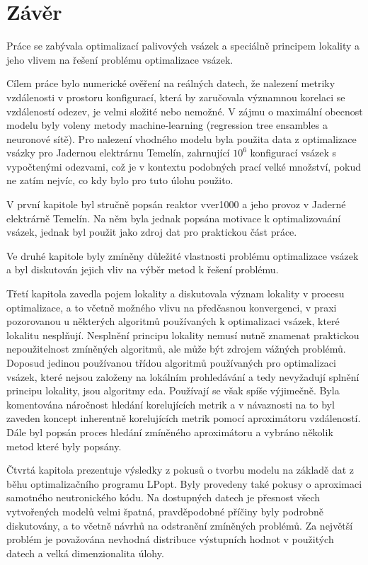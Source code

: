 \chapter*{Závěr} %
Práce se zabývala optimalizací palivových vsázek a speciálně 
principem lokality a jeho vlivem na řešení problému optimalizace vsázek. 

Cílem práce bylo numerické ověření na reálných datech, že nalezení 
metriky vzdálenosti v prostoru konfigurací, která by zaručovala 
významnou korelaci se vzdáleností odezev, je velmi složité nebo nemožné. 
V zájmu o maximální obecnost modelu byly voleny metody machine-learning 
(regression tree ensambles a neuronové sítě). Pro nalezení vhodného 
modelu byla použita data z optimalizace vsázky pro Jadernou elektrárnu 
Temelín, zahrnující $10^6$ konfigurací vsázek s vypočtenými odezvami, 
což je v kontextu podobných prací velké množství, pokud ne zatím nejvíc, 
co kdy bylo pro tuto úlohu použito. 

V první kapitole byl stručně popsán reaktor \ac{vver1000} a jeho provoz 
v Jaderné elektrárně Temelín. Na něm byla jednak popsána motivace 
k optimalizovaání vsázek, jednak byl použit jako zdroj dat pro 
praktickou část práce. 

Ve druhé kapitole byly zmíněny důležité vlastnosti problému optimalizace 
vsázek a byl diskutován jejich vliv na výběr metod k řešení problému. 

Třetí kapitola zavedla pojem lokality a diskutovala význam lokality 
v procesu optimalizace, a to včetně možného vlivu na předčasnou konvergenci, 
v praxi pozorovanou u některých algoritmů používaných k optimalizaci vsázek, 
které lokalitu nesplňují. Nesplnění principu lokality nemusí nutně znamenat 
praktickou nepoužitelnost zmíněných algoritmů, ale může být zdrojem vážných problémů. 
Doposud jedinou používanou třídou algoritmů používaných pro optimalizaci vsázek, 
které nejsou založeny na lokálním prohledávání a tedy nevyžadují splnění 
principu lokality, jsou algoritmy \ac{eda}. Používají se však spíše výjimečně. 
Byla komentována náročnost hledání korelujících 
metrik a v návaznosti na to byl zaveden koncept inherentně korelujících 
metrik pomocí aproximátoru vzdáleností. Dále byl popsán proces hledání 
zmíněného aproximátoru a vybráno několik metod které byly popsány. 

Čtvrtá kapitola prezentuje výsledky z pokusů o tvorbu modelu na 
základě dat z běhu optimalizačního programu LPopt. Byly provedeny 
také pokusy o aproximaci samotného neutronického kódu. Na dostupných 
datech je přesnost všech vytvořených modelů velmi špatná, pravděpodobné 
příčiny byly podrobně diskutovány, a to včetně návrhů na odstranění 
zmíněných problémů. Za největší problém je považována nevhodná distribuce 
výstupních hodnot v použitých datech a velká dimenzionalita úlohy. 

